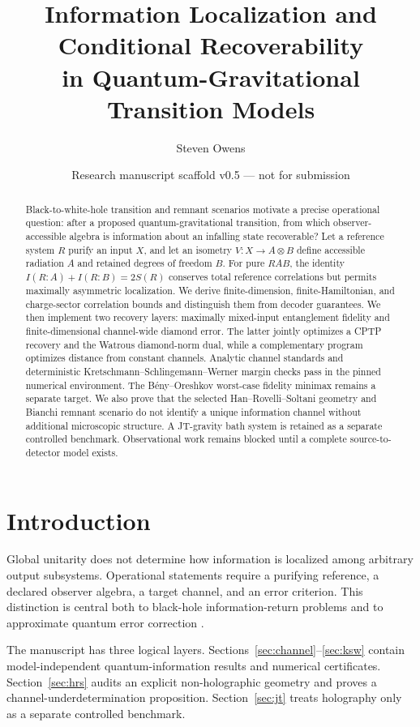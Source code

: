 \documentclass[11pt]{article}
\title{Information Localization and Conditional Recoverability\\
in Quantum-Gravitational Transition Models}
\author{Steven Owens}
\date{Research manuscript scaffold v0.5 --- not for submission}
\begin{document}
\maketitle

\begin{abstract}
Black-to-white-hole transition and remnant scenarios motivate a precise operational question: after a proposed quantum-gravitational transition, from which observer-accessible algebra is information about an infalling state recoverable? Let a reference system $R$ purify an input $X$, and let an isometry $V:X\rightarrow A\otimes B$ define accessible radiation $A$ and retained degrees of freedom $B$. For pure $RAB$, the identity $I(R:A)+I(R:B)=2S(R)$ conserves total reference correlations but permits maximally asymmetric localization. We derive finite-dimension, finite-Hamiltonian, and charge-sector correlation bounds and distinguish them from decoder guarantees. We then implement two recovery layers: maximally mixed-input entanglement fidelity and finite-dimensional channel-wide diamond error. The latter jointly optimizes a CPTP recovery and the Watrous diamond-norm dual, while a complementary program optimizes distance from constant channels. Analytic channel standards and deterministic Kretschmann--Schlingemann--Werner margin checks pass in the pinned numerical environment. The B\'eny--Oreshkov worst-case fidelity minimax remains a separate target. We also prove that the selected Han--Rovelli--Soltani geometry and Bianchi remnant scenario do not identify a unique information channel without additional microscopic structure. A JT-gravity bath system is retained as a separate controlled benchmark. Observational work remains blocked until a complete source-to-detector model exists.
\end{abstract}

\section{Introduction}
\label{sec:introduction}

Global unitarity does not determine how information is localized among arbitrary output subsystems. Operational statements require a purifying reference, a declared observer algebra, a target channel, and an error criterion. This distinction is central both to black-hole information-return problems \citep{Page1993Information,HaydenPreskill2007} and to approximate quantum error correction \citep{BenyOreshkov2009,KretschmannEtAl2006}.

The manuscript has three logical layers. Sections~\ref{sec:channel}--\ref{sec:ksw} contain model-independent quantum-information results and numerical certificates. Section~\ref{sec:hrs} audits an explicit non-holographic geometry and proves a channel-underdetermination proposition. Section~\ref{sec:jt} treats holography only as a separate controlled benchmark.
\end{document}
